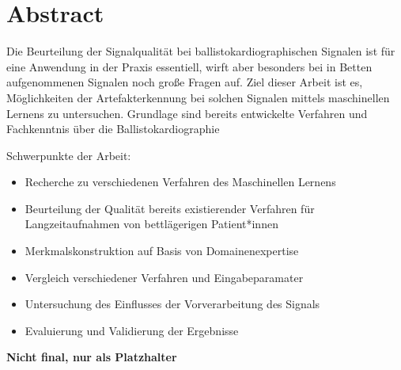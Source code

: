 \clearpage
\chapter*{Abstract}\label{abstract}

Die Beurteilung der Signalqualität bei ballistokardiographischen Signalen ist für eine Anwendung in der Praxis essentiell, wirft aber besonders bei in Betten aufgenommenen Signalen noch große Fragen auf. Ziel dieser Arbeit ist es, Möglichkeiten der Artefakterkennung bei solchen Signalen mittels maschinellen Lernens zu untersuchen. Grundlage sind bereits entwickelte Verfahren und Fachkenntnis über die Ballistokardiographie 

Schwerpunkte der Arbeit:
\begin{itemize}
	\item Recherche zu verschiedenen Verfahren des Maschinellen Lernens
	\item Beurteilung der Qualität bereits existierender Verfahren für Langzeitaufnahmen von bettlägerigen Patient*innen
	\item Merkmalskonstruktion auf Basis von Domainenexpertise
	\item Vergleich verschiedener Verfahren und Eingabeparamater
	\item Untersuchung des Einflusses der Vorverarbeitung des Signals
	\item Evaluierung und Validierung der Ergebnisse
\end{itemize}

\textbf{Nicht final, nur als Platzhalter}
